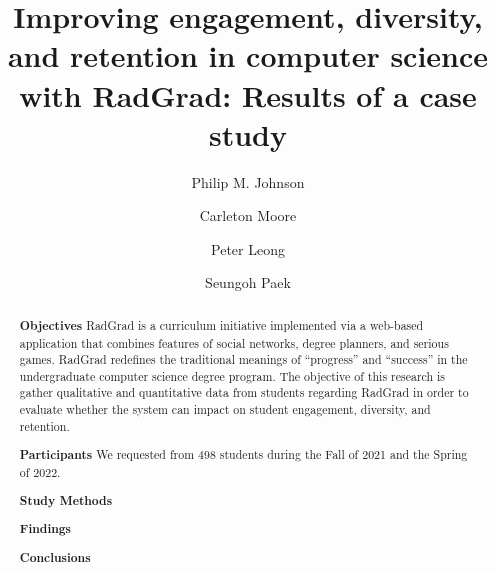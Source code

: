 \documentclass[acmsmall]{acmart}
\begin{document}
\title[RadGrad: Results of a case study]{Improving engagement, diversity, and retention in computer science with RadGrad: Results of a case study}

\author{Philip M. Johnson}
\author{Carleton Moore}

\author{Peter Leong}
\author{Seungoh Paek}

\renewcommand{\shortauthors}{You et al.}

\newcommand{\AbstractCategory}[1]{%
  \par\addvspace{.5\baselineskip}%
  \noindent\textbf{#1}\quad\ignorespaces
}

%
\begin{abstract}

\AbstractCategory{Objectives} %
RadGrad is a curriculum initiative implemented via a web-based application that combines features of social networks, degree planners, and serious games. RadGrad redefines the traditional meanings of ``progress'' and ``success'' in the undergraduate computer science degree program. The objective of this research is gather qualitative and quantitative data from students regarding RadGrad in order to evaluate whether the system can impact on student engagement, diversity, and retention.

\AbstractCategory{Participants} %
We requested from 498 students during the Fall of 2021 and the Spring of 2022.

\AbstractCategory{Study Methods}

\AbstractCategory{Findings}

\AbstractCategory{Conclusions}

\end{abstract}
\end{document}
